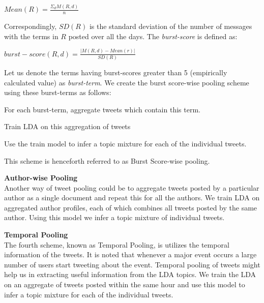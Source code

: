 \documentclass[10pt,a5paper,twoside]{article}
\begin{document}
\begin{compactenum}
\begin{center}
$ Mean(R) = \frac{\Sigma_d M(R,d)}{n} $
\end{center}

Correspondingly, $ SD(R) $ is the standard deviation of the number of messages with the terms in $R$ posted over all the days. The \textit{burst-score} is defined as:
\begin{center}
$ burst-score(R,d) = \frac{|M(R,d) - Mean(r)|}{SD(R)} $
\end{center}

Let us denote the terms having burst-scores greater than 5 (empirically calculated value) as \textit{burst-term}. We create the burst score-wise pooling scheme using these burst-terms as follows:
\begin{compactitem}
\item For each burst-term, aggregate tweets which contain this term.
\item Train LDA on this aggregation of tweets
\item Use the train model to infer a topic mixture for each of the individual tweets.
\end{compactitem}

This scheme is henceforth referred to as Burst Score-wise pooling.
\\

\item  \textbf{Author-wise Pooling}
\\
Another way of tweet pooling could be to aggregate tweets posted by a particular author as a single document and repeat this for all the authors. We train LDA on aggregated author profiles, each of which combines all tweets posted by the same author. Using this model we infer a topic mixture of individual tweets.
\\

\item  \textbf{Temporal Pooling}
\\
The fourth scheme, known as Temporal Pooling, is utilizes the temporal information of the tweets. It is noted that whenever a major event occurs a large number of users start tweeting about the event. Temporal pooling of tweets might help us in extracting useful information from the LDA topics. We train the LDA on an aggregate of tweets posted within the same hour and use this model to infer a topic mixture for each of the individual tweets.
\\


\end{compactenum}
\end{document}
